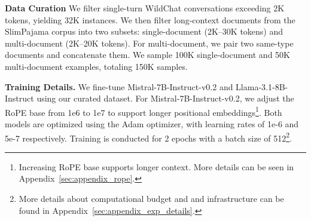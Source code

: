 

\textbf{Data Curation}
We filter single-turn WildChat conversations exceeding 2K tokens, yielding 32K instances. We then filter long-context documents from the SlimPajama corpus into two subsets: single-document (2K–30K tokens) and multi-document (2K–20K tokens). For multi-document, we pair two same-type documents and concatenate them. We sample 100K single-document and 50K multi-document examples, totaling 150K samples.

\textbf{Training Details.} We fine-tune Mistral-7B-Instruct-v0.2 and Llama-3.1-8B-Instruct using our curated dataset. For Mistral-7B-Instruct-v0.2, we adjust the RoPE base from 1e6 to 1e7 to support longer positional embeddings\footnote{Increasing RoPE base supports longer context. More details can be seen in Appendix~\ref{sec:appendix_rope}.}. Both models are optimized using the Adam optimizer, with learning rates of 1e-6 and 5e-7 respectively. Training is conducted for 2 epochs with a batch size of 512\footnote{More details about computational budget and and infrastructure can be found in Appendix~\ref{sec:appendix_exp_details}.}.



